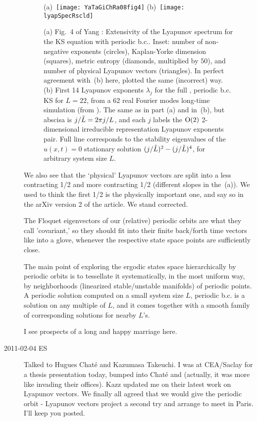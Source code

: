 \begin{description}
\begin{figure}
 (a)~\texttt{[image: YaTaGiChRa08fig4]}
 (b)~\texttt{[image: lyapSpecRscld]}
\caption{
(a)
Fig.~4 of
Yang \etal{}:
Extensivity of the Lyapunov spectrum for the KS equation with
periodic b.c.. Inset: number of non-negative exponents (circles),
Kaplan-Yorke dimension (squares), metric entropy (diamonds,
multiplied by $50$), and number of physical Lyapunov vectors (triangles).
In perfect agreement with
\,(b) here, plotted the same
(incorrect) way.
(b)
First 14 Lyapunov exponents $\lambda_j$ for the full
\statesp, periodic b.c. KS for $L=22$, from a 62 real Fourier
modes long-time simulation (from ).
The same as in part (a) and in \,(b), but
abscisa is $j/\tilde{L} = 2 \pi j/L$, and each $j$ labels
the $\textrm{O}(2)$ 2-dimensional irreducible representation
Lyapunov exponents pair.  Full line corresponds to
the stability eigenvalues
of the $u(x,t)=0$ stationary solution
$(j/\tilde{L})^2- (j/\tilde{L})^4$, for arbitrary system size $L$.
}
\label{fig:lyapSpecRscld}
\end{figure}


We also see
that the `physical' Lyapunov vectors are split into a less contracting 1/2
and more contracting 1/2 (different slopes in the
\,(a)). We
used to think the first 1/2 is the physically important one,
and say so in the arXiv version 2 of the article.
We stand corrected.

The Floquet eigenvectors of our (relative) periodic orbits are
what they call 'covariant,' so they should fit into their finite back/forth
time vectors like into a glove, whenever the respective state space
points are sufficiently close.

The main point of exploring the ergodic states space hierarchically
by periodic orbits is to tessellate it systematically, in the most
uniform way, by neighborhoods (linearized stable/unstable manifolds)
of periodic points. A periodic solution computed on a small system
size $L$, periodic b.c. is a solution on any multiple of $L$, and it comes
together with a smooth family of corresponding solutions for nearby
$L$'s.

I see prospects of a long and happy marriage here.

\item[2011-02-04 ES] Talked to Hugues Chat\'{e} and Kazumasa Takeuchi.
I was at CEA/Saclay for a thesis presentation today, bumped into Chat\'{e}
and
(actually, it was more like invading their offices). Kazz updated me on
their latest work on Lyapunov vectors. We finally all agreed that we would give
the periodic orbit - Lyapunov vectors project a second try and arrange to meet
in Paris. I'll keep you posted.



\end{description}
